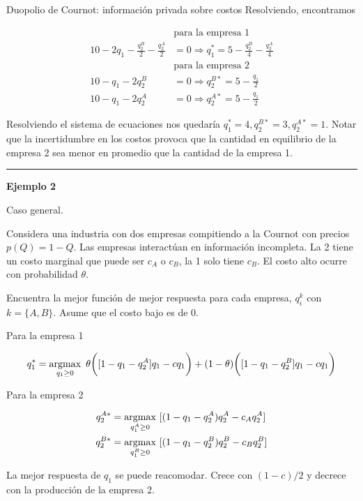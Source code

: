 \documentclass[12pt]{article}
\begin{document}
\begin{exbox}{Duopolio de Cournot: información privada sobre costos}
	Resolviendo, encontramos

	\begin{align*}
		                                             & \text{para la empresa 1}                                         \\
		10 - 2q_1 -\frac{q_2^B}{2} - \frac{q_2^A}{2} & = 0 \Longrightarrow q_1^* = 5 -\frac{q_2^B}{4} - \frac{q_2^A}{4} \\
		                                             & \text{para la empresa 2}                                         \\
		10 - q_1 - 2q_2^B                            & = 0 \Longrightarrow q_2^{B*} = 5 - \frac{q_1}{2}                 \\
		10 - q_1 - 2q_2^A                            & = 0 \Longrightarrow q_2^{A*} = 5 - \frac{q_1}{2}
	\end{align*}

	Resolviendo el sistema de ecuaciones nos quedaría $ q_1^* = 4, q_2^{B*} = 3, q_2^{A*} = 1 $. Notar que la incertidumbre en los costos provoca que la cantidad en equilibrio de la empresa 2 sea menor en promedio que la cantidad de la empresa 1.

	\rule{2cm}{1pt}

	\textbf{Ejemplo 2}

	Caso general.

	Considera una industria con dos empresas compitiendo a la Cournot con precios $ p(Q) = 1 - Q $. Las empresas interactúan en información incompleta. La 2 tiene un costo marginal que puede ser $ c_A $ o $ c_B $, la 1 solo tiene $ c_B$. El costo alto ocurre con probabilidad $ \theta $.

	Encuentra la mejor función de mejor respuesta para cada empresa, $ q_i^k $ con $ k = \{A, B\} $. Asume que el costo bajo es de 0.

	Para la empresa 1

	\[ q_1^* = \operatorname*{argmax}_{q_1 \geq 0}~\theta\biggl([1 - q_1 - q_2^A]q_1 -cq_1\biggr) + (1 - \theta)\biggl([1 - q_1 - q_2^B]q_1 -cq_1\biggr) \]

	Para la empresa 2

	\begin{align*}
		q_2^{A*} & = \operatorname*{argmax}_{ q_1^A\geq 0}~[(1-q_1 - q_2^A)q_2^A - c_Aq_2^A] \\
		q_2^{B*} & = \operatorname*{argmax}_{q_1^B\geq 0 }~[(1-q_1 - q_2^B)q_2^B - c_Bq_2^B]
	\end{align*}

	La mejor respuesta de $ q_1 $ se puede reacomodar. Crece con $(1-c)/2 $ y decrece con la producción de la empresa 2.


\end{exbox}
\end{document}
